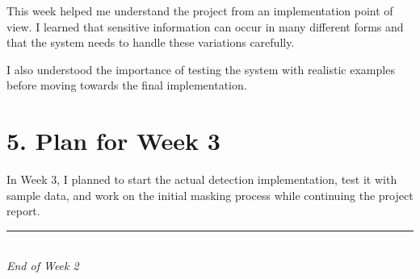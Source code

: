 \documentclass[11pt,a4paper]{article}
\begin{document}
This week helped me understand the project from an implementation point
of view. I learned that sensitive information can occur in many different
forms and that the system needs to handle these variations carefully.

I also understood the importance of testing the system with realistic
examples before moving towards the final implementation.

\section*{5. Plan for Week 3}

In Week 3, I planned to start the actual detection implementation, test it
with sample data, and work on the initial masking process while continuing
the project report.

\vfill

\begin{center}
    \textcolor{darkblue}{\rule{0.35\textwidth}{0.5pt}}\\[3pt]
    \textit{\small End of Week 2}
\end{center}
\end{document}
